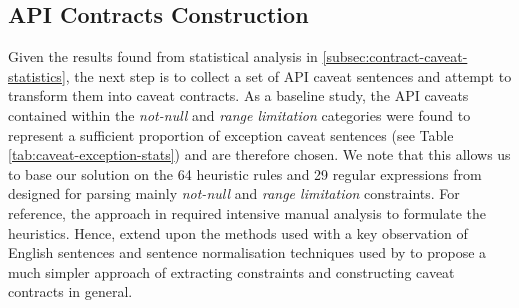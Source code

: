\subsection{API Contracts Construction}
\label{subsec:contract-construct}
Given the results found from statistical analysis in \ref{subsec:contract-caveat-statistics}, the next step is to collect a set of API caveat sentences and attempt to transform them into caveat contracts. As a baseline study, the API caveats contained within the \textit{not-null} and \textit{range limitation} categories were found to represent a sufficient proportion of exception caveat sentences (see Table \ref{tab:caveat-exception-stats}) and are therefore chosen. 
We note that this allows us to base our solution on the 64 heuristic rules and 29 regular expressions from \cite{zhou-directive} designed for parsing mainly \textit{not-null} and \textit{range limitation} constraints. For reference, the approach in \cite{zhou-directive} required intensive manual analysis to formulate the heuristics. Hence, extend upon the methods used with a key observation of English sentences and sentence normalisation techniques used by \cite{blasi2018translating} to propose a much simpler approach of extracting constraints and constructing caveat contracts in general. \bigbreak

